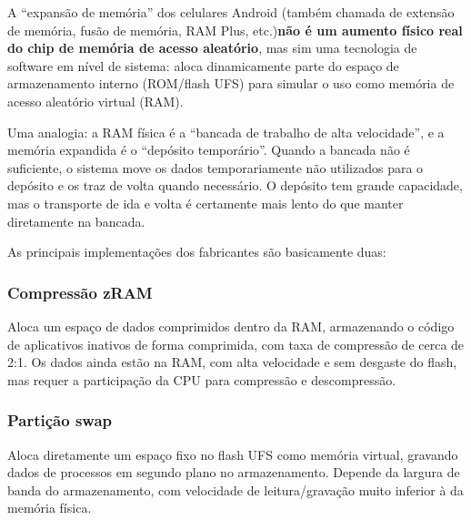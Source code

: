 


A “expansão de memória” dos celulares Android (também chamada de extensão de memória, fusão de memória, RAM Plus, etc.)\textbf{não é um aumento físico real do chip de memória de acesso aleatório}, mas sim uma tecnologia de software em nível de sistema: aloca dinamicamente parte do espaço de armazenamento interno (ROM/flash UFS) para simular o uso como memória de acesso aleatório virtual (RAM).

Uma analogia: a RAM física é a “bancada de trabalho de alta velocidade”, e a memória expandida é o “depósito temporário”. Quando a bancada não é suficiente, o sistema move os dados temporariamente não utilizados para o depósito e os traz de volta quando necessário. O depósito tem grande capacidade, mas o transporte de ida e volta é certamente mais lento do que manter diretamente na bancada.


As principais implementações dos fabricantes são basicamente duas:

\subsubsection*{Compressão zRAM}

Aloca um espaço de dados comprimidos dentro da RAM, armazenando o código de aplicativos inativos de forma comprimida, com taxa de compressão de cerca de 2:1. Os dados ainda estão na RAM, com alta velocidade e sem desgaste do flash, mas requer a participação da CPU para compressão e descompressão.

\subsubsection*{Partição swap}

Aloca diretamente um espaço fixo no flash UFS como memória virtual, gravando dados de processos em segundo plano no armazenamento. Depende da largura de banda do armazenamento, com velocidade de leitura/gravação muito inferior à da memória física.

